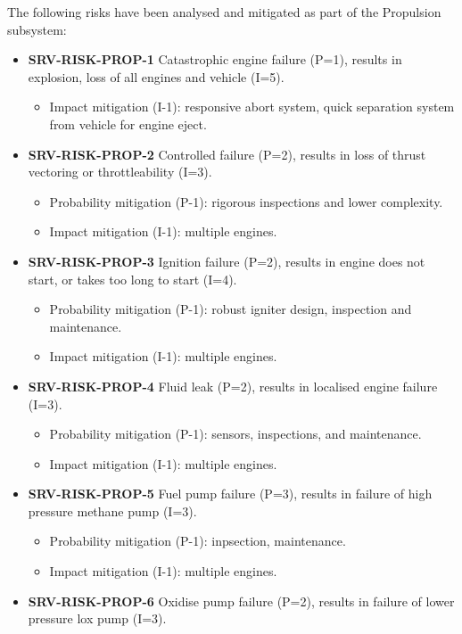 \noindent The following risks have been analysed and mitigated as part of the Propulsion subsystem:

\begin{itemize}
	 \item \textbf{SRV-RISK-PROP-1} Catastrophic engine failure (P=1), results in explosion, loss of all engines and vehicle (I=5).
	\begin{itemize}
		 \item Impact mitigation (I-1): responsive abort system,  quick separation system from vehicle for engine eject.	\end{itemize}
	 \item \textbf{SRV-RISK-PROP-2} Controlled failure (P=2), results in loss of thrust vectoring or throttleability (I=3).
	\begin{itemize}
		 \item Probability mitigation (P-1): rigorous inspections and lower complexity.		 \item Impact mitigation (I-1): multiple engines.	\end{itemize}
	 \item \textbf{SRV-RISK-PROP-3} Ignition failure (P=2), results in engine does not start, or takes too long to start (I=4).
	\begin{itemize}
		 \item Probability mitigation (P-1): robust igniter design, inspection and maintenance.		 \item Impact mitigation (I-1): multiple engines.	\end{itemize}
	 \item \textbf{SRV-RISK-PROP-4} Fluid leak (P=2), results in localised engine failure (I=3).
	\begin{itemize}
		 \item Probability mitigation (P-1): sensors, inspections, and maintenance.		 \item Impact mitigation (I-1): multiple engines.	\end{itemize}
	 \item \textbf{SRV-RISK-PROP-5} Fuel pump failure (P=3), results in failure of high pressure methane pump (I=3).
	\begin{itemize}
		 \item Probability mitigation (P-1): inpsection, maintenance.		 \item Impact mitigation (I-1): multiple engines.	\end{itemize}
	 \item \textbf{SRV-RISK-PROP-6} Oxidise pump failure (P=2), results in failure of lower pressure lox pump (I=3).

\end{itemize}
